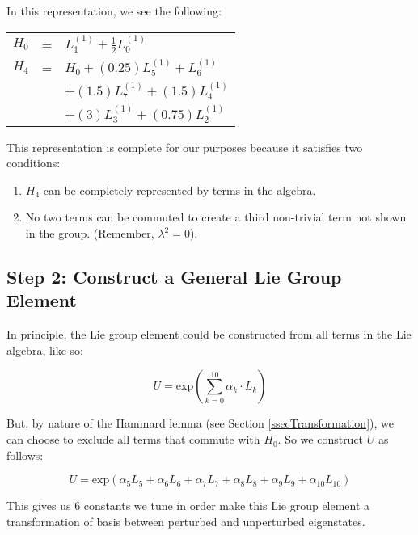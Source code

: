 \documentclass{article}
\begin{document}
In this representation, we see the following:

\begin{table}[!hp]
\begin{center}
\begin{tabular}{rcl}
$H_{0}$ & = & $L_{1}^{(1)}+\frac{1}{2}L_{0}^{(1)}$ \\
$H_{4}$ & = & $H_{0} + (0.25)L_{5}^{(1)} + L_{6}^{(1)}$ \nonumber \\
        &   & $+ (1.5)L_{7}^{(1)} + (1.5)L_{4}^{(1)}$ \nonumber \\
        &   & $+ (3)L_{3}^{(1)} + (0.75)L_{2}^{(1)}$
\end{tabular}
\end{center}
\end{table}

\clearpage
\newpage

This representation is complete for our purposes because it satisfies two conditions:
\label{secTwoConditions}

\begin{enumerate}
\item $H_{4}$ can be completely represented by terms in the algebra.
\item No two terms can be commuted to create a third non-trivial term not shown in the group.  (Remember, $\lambda^{2} = 0$).
\end{enumerate}

\subsection{Step 2: Construct a General Lie Group Element}

In principle, the Lie group element could be constructed from all terms in the Lie algebra, like so:

\begin{equation}
U = \textrm{exp}(\sum\limits_{k=0}^{10} \alpha_{k}{\cdot}L_{k})
\end{equation}

But, by nature of the Hammard lemma (see Section \ref{ssecTransformation}), we can choose to exclude all terms that commute with $H_{0}$.  So we construct $U$ as follows:

\begin{equation}
U = \textrm{exp}(\alpha_{5}L_{5}+\alpha_{6}L_{6}+\alpha_{7}L_{7}+\alpha_{8}L_{8}+\alpha_{9}L_{9}+\alpha_{10}L_{10})
\end{equation}

This gives us 6 constants we tune in order make this Lie group element a transformation of basis between perturbed and unperturbed eigenstates.
\end{document}
